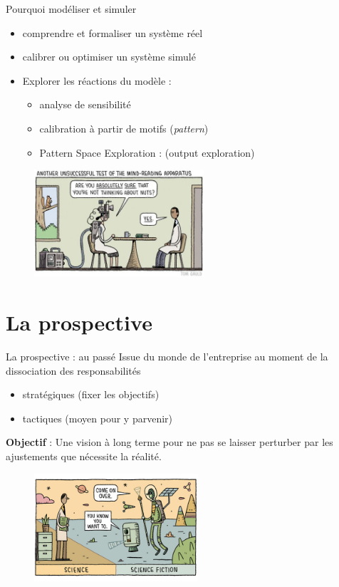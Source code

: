 \documentclass[newPxFont]{beamer}
\begin{document}
\begin{frame}[c]{Pourquoi modéliser et simuler}
  \vspace{-2em}
  \begin{itemize}
    \item comprendre et formaliser un système réel
    \item calibrer ou optimiser un système simulé
    \item Explorer les réactions du modèle :
    \begin{itemize}
      \item analyse de sensibilité
      \item calibration à partir de motifs (\textit{pattern})
      \item Pattern Space Exploration : (output exploration)
    \end{itemize}
  \end{itemize}
  \vspace{-1em}
  \begin{figure}
   \includegraphics[height=4cm]{img/a_gauld_nutts.jpg}
  \end{figure}
\end{frame}

%
%
\section{La prospective}

\begin{frame}[c]{La prospective : au passé}
  \vspace{-2em}
  Issue du monde de l'entreprise au moment de la dissociation des responsabilités
  \begin{itemize}
    \item stratégiques (fixer les objectifs)
    \item tactiques (moyen pour y parvenir)
  \end{itemize}
  \textbf{Objectif} : Une vision à long terme pour ne pas se laisser perturber par les ajustements que nécessite la réalité.
  \begin{figure}
   \includegraphics[height=4cm]{img/a_gauld_tom_new_scientist.jpg}
  \end{figure}
\end{frame}
\end{document}
